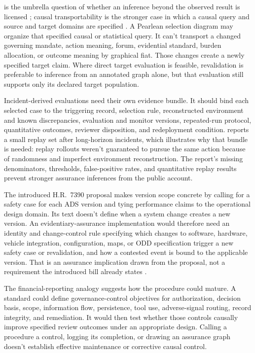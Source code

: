  is the umbrella question of whether an inference beyond the observed result is licensed \citep{Goodman1955,reynolds2026kindsProjectibilityProfiles}; causal transportability is the stronger case in which a causal query and source and target domains are specified \citep{pearlBareinboim2014externalValidity}. A Pearlean selection diagram may organize that specified causal or statistical query. It can't transport a changed governing mandate, action meaning, forum, evidential standard, burden allocation, or outcome meaning by graphical fiat. Those changes create a newly specified target claim. Where direct target evaluation is feasible, revalidation is preferable to inference from an annotated graph alone, but that evaluation still supports only its declared target population.

Incident-derived evaluations need their own evidence bundle. It should bind each selected case to the triggering record, selection rule, reconstructed environment and known discrepancies, evaluation and monitor versions, repeated-run protocol, quantitative outcomes, reviewer disposition, and redeployment condition. \textcite{openai2026longHorizonSafety} reports a small replay set after long-horizon incidents, which illustrates why that bundle is needed: replay rollouts weren't guaranteed to pursue the same action because of randomness and imperfect environment reconstruction. The report's missing denominators, thresholds, false-positive rates, and quantitative replay results prevent stronger assurance inferences from the public account.

The introduced H.R.~7390 proposal makes version scope concrete by calling for a safety case for each ADS version and tying performance claims to the operational design domain. Its text doesn't define when a system change creates a new version. An evidentiary-assurance implementation would therefore need an identity and change-control rule specifying which changes to software, hardware, vehicle integration, configuration, maps, or ODD specification trigger a new safety case or revalidation, and how a contested event is bound to the applicable version. That is an assurance implication drawn from the proposal, not a requirement the introduced bill already states \citep{usCongress2026selfDriveAct}.

The financial-reporting analogy suggests how the procedure could mature. A standard could define governance-control objectives for authorization, decision basis, scope, information flow, persistence, tool use, adverse-signal routing, record integrity, and remediation. It would then test whether those controls causally improve specified review outcomes under an appropriate design. Calling a procedure a control, logging its completion, or drawing an assurance graph doesn't establish effective maintenance or corrective causal control.

